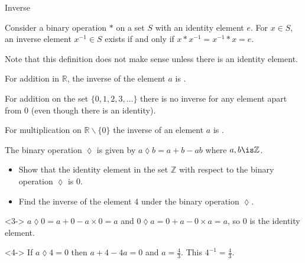 \documentclass[8pt]{beamer}
\newcommand{\R}{\mathbb{R}}
\newcommand{\Z}{\mathbb{Z}}
\newcommand{\sol}[2][+]{
\tikz[baseline]{\node[color=aa,fill=cc,rectangle,draw,anchor=base] {\onslide<#1->{#2}};}
}
\begin{document}
\begin{frame}{Inverse}
	\begin{definition}
		Consider a binary operation $*$ on a set  $S$ with an identity element  $e$. For  $x\in S$, an inverse element  $x^{-1}\in S$ exists if and only if $x*x^{-1}=x^{-1}*x=e$.
	\end{definition}

	\alert<1>{Note that this definition does not make sense unless there is an identity element.}

	For addition in $\R$, the inverse of the element $a$ is \sol{ $-a$}.

	For addition on the set $\{0,1,2,3,\ldots\}$ there is no inverse for any element apart from 0 (even though there is an identity).

	For multiplication on $\R \backslash \{0\}$ the inverse of an element $a$ is \sol{ $\frac{1}{a}$ }.

	\begin{problem}
		The binary operation $\lozenge$ is given by  $a\lozenge b = a+b-ab$ where  $a,b\is \Z$.
		\begin{itemize}
			\item Show that the identity element in the set $\Z$ with respect to the binary operation $\lozenge$ is 0.
			\item Find the inverse of the element 4 under the binary operation  $\lozenge$.
		\end{itemize}

	\end{problem}
	\begin{solution}<3->
		$a\lozenge 0 = a+0 -a \times 0=a $ and $0\lozenge a=0+a-0\times a=a$, so 0 is the identity element.
	\end{solution}
	\begin{solution}<4->
		If $a\lozenge 4=0$ then $a+4-4a=0$ and  $a=\frac{4}{3}$. This $4^{-1}=\frac{4}{3}$. 
	\end{solution}
	
\end{frame}
\end{document}
